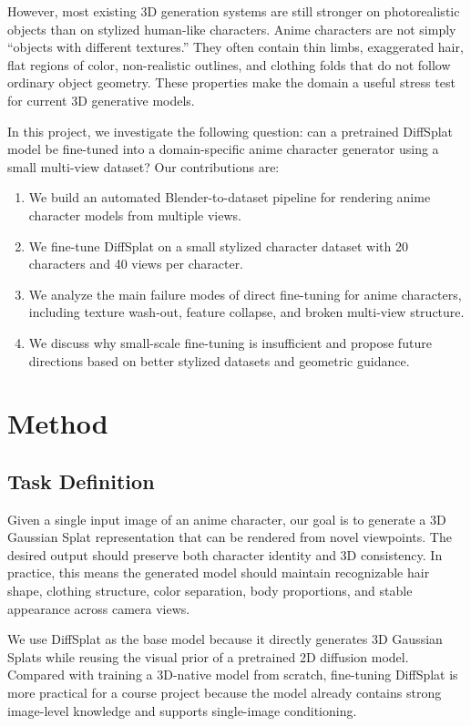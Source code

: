\documentclass[10pt,twocolumn,letterpaper]{article}
\begin{document}
However, most existing 3D generation systems are still stronger on photorealistic objects than on stylized human-like characters. Anime characters are not simply ``objects with different textures.'' They often contain thin limbs, exaggerated hair, flat regions of color, non-realistic outlines, and clothing folds that do not follow ordinary object geometry. These properties make the domain a useful stress test for current 3D generative models.

In this project, we investigate the following question: can a pretrained DiffSplat model be fine-tuned into a domain-specific anime character generator using a small multi-view dataset? Our contributions are:
\begin{enumerate}
    \item We build an automated Blender-to-dataset pipeline for rendering anime character models from multiple views.
    \item We fine-tune DiffSplat on a small stylized character dataset with 20 characters and 40 views per character.
    \item We analyze the main failure modes of direct fine-tuning for anime characters, including texture wash-out, feature collapse, and broken multi-view structure.
    \item We discuss why small-scale fine-tuning is insufficient and propose future directions based on better stylized datasets and geometric guidance.
\end{enumerate}

\section{Method}

\subsection{Task Definition}

Given a single input image of an anime character, our goal is to generate a 3D Gaussian Splat representation that can be rendered from novel viewpoints. The desired output should preserve both character identity and 3D consistency. In practice, this means the generated model should maintain recognizable hair shape, clothing structure, color separation, body proportions, and stable appearance across camera views.

We use DiffSplat as the base model because it directly generates 3D Gaussian Splats while reusing the visual prior of a pretrained 2D diffusion model. Compared with training a 3D-native model from scratch, fine-tuning DiffSplat is more practical for a course project because the model already contains strong image-level knowledge and supports single-image conditioning.
\end{document}
